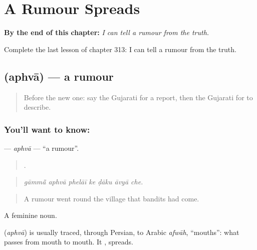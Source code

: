 
\chapter{A Rumour Spreads}
\label{ch:gu-a-rumour-spreads}

\begin{chapteropening}
\textbf{By the end of this chapter:} \emph{I can tell a rumour from the truth.}

Complete the last lesson of chapter 313: I can tell a rumour from the truth.
\end{chapteropening}

\section[\texorpdfstring{\gu{અફવા} (aphvā)}{અફવા (aphvā)}]{ (aphvā) — a rumour}

\label{lesson:GU-C313-aphva}



\begin{quote}
Before the new one: say the Gujarati for a report, then the Gujarati for to describe.
\end{quote}

\subsection*{You'll want to know: }
\textbf{} — \emph{aphvā} — \textquotedblleft{}a rumour\textquotedblright{}.

\begin{quote}
      .
\end{quote}

\begin{quote}
\emph{gāmmā̃ aphvā phelāī ke ḍāku āvyā che.}
\end{quote}

\begin{quote}
A rumour went round the village that bandits had come.
\end{quote}

A feminine noun.

\begin{cousinweb}
\textbf{} (\emph{aphvā}) is usually traced, through Persian, to Arabic \emph{afwāh}, \textquotedblleft{}mouths\textquotedblright{}: what passes from mouth to mouth. It \textbf{ }, spreads.
\end{cousinweb}

